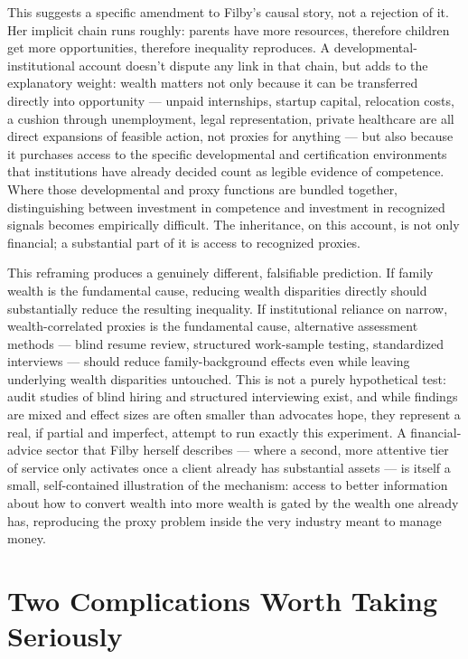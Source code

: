 \documentclass[11pt]{article}
\begin{document}
This suggests a specific amendment to Filby's causal story, not a rejection of it. Her implicit chain runs roughly: parents have more resources, therefore children get more opportunities, therefore inequality reproduces. A developmental-institutional account doesn't dispute any link in that chain, but adds to the explanatory weight: wealth matters not only because it can be transferred directly into opportunity --- unpaid internships, startup capital, relocation costs, a cushion through unemployment, legal representation, private healthcare are all direct expansions of feasible action, not proxies for anything --- but also because it purchases access to the specific developmental and certification environments that institutions have already decided count as legible evidence of competence. Where those developmental and proxy functions are bundled together, distinguishing between investment in competence and investment in recognized signals becomes empirically difficult. The inheritance, on this account, is not only financial; a substantial part of it is access to recognized proxies.

This reframing produces a genuinely different, falsifiable prediction. If family wealth is the fundamental cause, reducing wealth disparities directly should substantially reduce the resulting inequality. If institutional reliance on narrow, wealth-correlated proxies is the fundamental cause, alternative assessment methods --- blind resume review, structured work-sample testing, standardized interviews --- should reduce family-background effects even while leaving underlying wealth disparities untouched. This is not a purely hypothetical test: audit studies of blind hiring and structured interviewing exist, and while findings are mixed and effect sizes are often smaller than advocates hope, they represent a real, if partial and imperfect, attempt to run exactly this experiment. A financial-advice sector that Filby herself describes --- where a second, more attentive tier of service only activates once a client already has substantial assets --- is itself a small, self-contained illustration of the mechanism: access to better information about how to convert wealth into more wealth is gated by the wealth one already has, reproducing the proxy problem inside the very industry meant to manage money.

\section{Two Complications Worth Taking Seriously}
\end{document}
